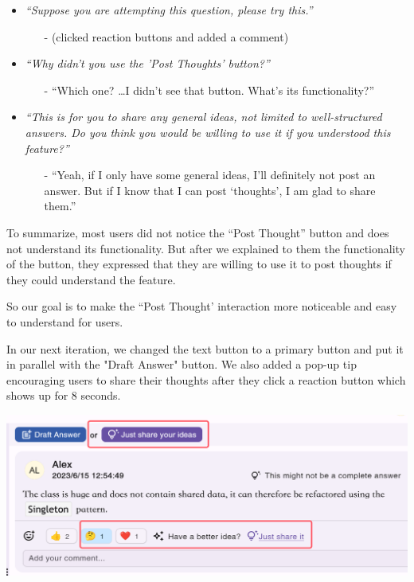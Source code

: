 \documentclass[a4paper]{article}
\begin{document}
    \begin{itemize}
        \item \textit{``Suppose you are attempting this question, please try this.''}
        \begin{itemize}
            \item[-] (clicked reaction buttons and added a comment)
        \end{itemize}

        \item \textit{``Why didn't you use the 'Post Thoughts' button?''}
        \begin{itemize}
            \item[-] ``Which one? \ldots I didn't see that button.
            What's its functionality?''
        \end{itemize}

        \item
        \textit{``This is for you to share any general ideas, not limited to well-structured answers.
        Do you think you would be willing to use it if you understood this feature?''}
        \begin{itemize}
            \item[-] ``Yeah, if I only have some general ideas, I'll definitely not post an answer.
            But if I know that I can post `thoughts', I am glad to share them.''
        \end{itemize}
    \end{itemize}

    To summarize, most users did not notice the ``Post Thought'' button and does not understand its functionality.
    But after we explained to them the functionality of the button, they expressed that they are willing to use it to post thoughts
    if they could understand the feature.

    So our goal is to make the ``Post Thought' interaction more noticeable and easy to understand for users.

    In our next iteration, we changed the text button to a primary button and put it in parallel with the "Draft Answer" button.
    We also added a pop-up tip encouraging users to share their thoughts after they click a reaction button which shows up for 8 seconds.

    \noindent \includegraphics[width=\textwidth]{thought2}
\end{document}
